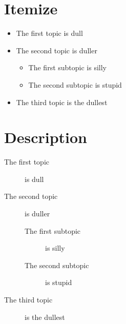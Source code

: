 \section*{Itemize}
\begin{itemize}
\item The first topic is dull
\item The second topic is duller
\begin{itemize}
\item The first subtopic is silly
\item The second subtopic is stupid
\end{itemize}
\item The third topic is the dullest
\end{itemize}

\section*{Description}
\begin{description}
\item[The first topic] is dull
\item[The second topic] is duller
\begin{description}
\item[The first subtopic] is silly
\item[The second subtopic] is stupid
\end{description}
\item[The third topic] is the dullest
\end{description}


\clearpage

